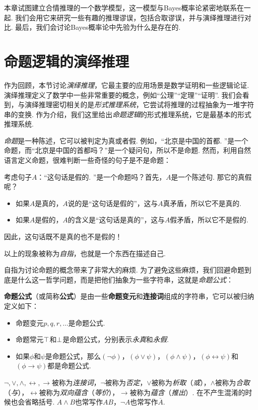 本章试图建立合情推理的一个数学模型，这一模型与Bayes概率论紧密地联系在一起. 我们会用它来研究一些有趣的推理谬误，包括合取谬误，并与演绎推理进行对比. 最后，我们会讨论Bayes概率论中先验为什么是存在的.

\section{命题逻辑的演绎推理}

作为回顾，本节讨论\textit{演绎推理}，它最主要的应用场景是数学证明和一些逻辑论证. 演绎推理定义了数学中一些非常重要的概念，例如“公理”“定理”“证明”. 我们会看到，与演绎推理密切相关的是\textit{形式推理系统}，它尝试将推理的过程抽象为一堆字符串的变换. 作为介绍，我们这里给出\textit{命题逻辑}的形式推理系统，它是最基本的形式推理系统. 

\textit{命题}是一种陈述，它可以被判定为真或者假. 例如，“北京是中国的首都. ”是一个命题，而“北京是中国的首都吗？”是一个疑问句，所以不是命题. 然而，利用自然语言定义命题，很难判断一些奇怪的句子是不是命题：

\begin{example}
考虑句子$A$：“这句话是假的. ”是一个命题吗？首先，$A$是一个陈述句. 那它的真假呢？
\begin{itemize}
    \item 如果$A$是真的，$A$说的是“这句话是假的”，这与$A$真矛盾，所以它不是真的. 
    \item 如果$A$是假的，$A$的含义是“这句话是真的”，这与$A$假矛盾，所以它不是假的. 
\end{itemize}
因此，这句话既不是真的也不是假的！
\end{example}

以上的现象被称为\textit{自指}，也就是一个东西在描述自己.

自指为讨论命题的概念带来了非常大的麻烦. 为了避免这些麻烦，我们回避命题到底是什么这一哲学问题，而是把他们抽象为一些字符串，这就是\textit{命题公式}：

\begin{definition}[命题公式]
\textbf{命题公式}（或简称\textbf{公式}）是由一些\textbf{命题变元}和\textbf{连接词}组成的字符串，它可以被归纳定义如下：
\begin{itemize}
    \item 命题变元$p,q,r,\dots$是命题公式. 
    \item 命题常元$\top$和$\bot$是命题公式，分别表示\textit{永真}和\textit{永假}.
    \item 如果$\phi$和$\psi$是命题公式，那么$(\neg\phi)$，$(\phi\vee\psi)$，$(\phi\wedge\psi)$，$(\phi\leftrightarrow\psi)$和$(\phi\to\psi)$都是命题公式. 
\end{itemize}

$\neg,\vee,\wedge,\leftrightarrow,\to$被称为\textit{连接词}，$\neg$被称为\textit{否定}，$\vee$被称为\textit{析取}（\textit{或}），$\wedge$被称为\textit{合取}（\textit{与}），$\leftrightarrow$被称为\textit{双向蕴含}（\textit{等价}），$\to$被称为\textit{蕴含}（\textit{推出}）. 在不产生混淆的时候也会省略括号. $A\wedge B$也常写作$AB$，$\neg A$也常写作$\overline{A}$.
\end{definition}

